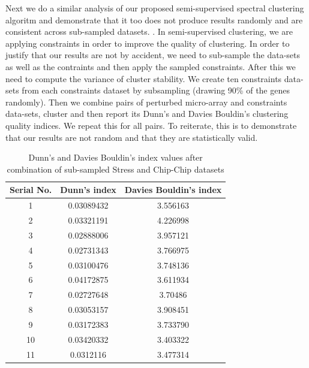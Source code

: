 Next we do a similar analysis of our proposed semi-supervised spectral clustering algoritm and demonstrate that it too does not produce results randomly and are consistent across sub-sampled datasets. . In semi-supervised clustering, we are applying constraints in order to improve the quality 
of clustering. In order to justify that our results are not by accident, we need to sub-sample the data-sets as well as the contraints and then apply the sampled constraints. After this we need to compute the 
variance of cluster stability. We create ten constraints data-sets from each constraints dataset by subsampling (drawing 90\% of the genes randomly). Then we combine pairs of perturbed micro-array and constraints data-sets, 
cluster and then report its Dunn’s and Davies Bouldin's clustering quality indices. We repeat this for all pairs. To reiterate, this is to demonstrate that our results are not 
random and that they are statistically valid.

\begin{table}
\centering
\begin{tabular}{|c|c|c|}
\hline
Serial No. & Dunn’s index  & Davies Bouldin’s index\\
\hline
1 & 0.03089432 & 3.556163 \\
2 & 0.03321191 & 4.226998 \\
3 & 0.02888006 & 3.957121 \\
4 & 0.02731343 & 3.766975 \\
5 & 0.03100476 & 3.748136 \\
6 & 0.04172875 & 3.611934 \\
7 & 0.02727648 & 3.70486 \\
8 & 0.03053157 & 3.908451 \\
9 & 0.03172383 & 3.733790 \\
10 & 0.03420332 & 3.403322 \\
11 & 0.0312116 & 3.477314 \\
\hline 
\end{tabular}
\caption{Dunn's and Davies Bouldin's index values after combination of sub-sampled Stress and Chip-Chip datasets}
\label{tab:stress_chip_perturbed}
\end{table}


